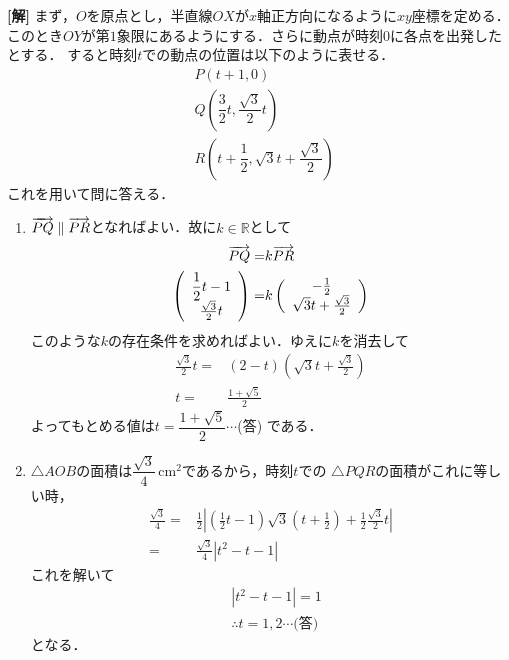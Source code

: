 \documentclass[a4j]{jarticle}
\begin{document}
\setlength{\columnseprule}{0.4pt}
\begin{multicols}{2}

{\bf[解]} まず，$O$を原点とし，半直線$OX$が$x$軸正方向になるように$xy$座標を定める．このとき$OY$が第$1$象限にあるようにする．さらに動点が時刻$0$に各点を出発したとする．
すると時刻$t$での動点の位置は以下のように表せる．
     \begin{align*}
     &P(t+1,0) \\
     &Q(\dfrac{3}{2}t,\dfrac{\sqrt{3}}{2}t) \\
     & R(t+\dfrac{1}{2},\sqrt{3}t+\dfrac{\sqrt{3}}{2})
     \end{align*}
これを用いて問に答える．
     \begin{enumerate}[(1)]
     \item $\overrightarrow{PQ}\parallel\overrightarrow{PR}$となればよい．故に$k\in\mathbb{R}$として
          \begin{align*}
          \overrightarrow{PQ}=&k\overrightarrow{PR} \\
          \left( \begin{array}{c} \dfrac{1}{2}t-1 \\\frac{\sqrt{3}}{2}t \\\end{array} \right)=&k\left( \begin{array}{c} -\frac{1}{2} \\\sqrt{3}t+\frac{\sqrt{3}}{2} \\\end{array} \right)
          \end{align*}
     このような$k$の存在条件を求めればよい．ゆえに$k$を消去して
          \begin{align*}
          \frac{\sqrt{3}}{2}t=&(2-t)(\sqrt{3}t+\frac{\sqrt{3}}{2}) \\
          t=&\frac{1+\sqrt{5}}{2}
          \end{align*}
     よってもとめる値は$t=\dfrac{1+\sqrt{5}}{2}\cdots$(答) である．

     \item $\triangle AOB$の面積は$\dfrac{\sqrt3}{4}\,\mathrm{cm^2}$であるから，時刻$t$での
     $\triangle PQR$の面積がこれに等しい時，
          \begin{align*}
          \frac{\sqrt3}{4}=&\frac{1}{2}\left|\left(\frac{1}{2}t-1\right)\sqrt{3}\left(t+\frac{1}{2}\right)%
          +\frac{1}{2}\frac{\sqrt{3}}{2}t\right| \\
          = &\frac{\sqrt3}{4}\left|t^2-t-1\right| 
          \end{align*}
          これを解いて
          \begin{align*}
          &\left|t^2-t-1\right|=1 \\
          &\therefore  t=1,2 \cdots\text{(答)}
          \end{align*}
          となる．
     \end{enumerate}
     
\newpage
\end{multicols}
\end{document}
